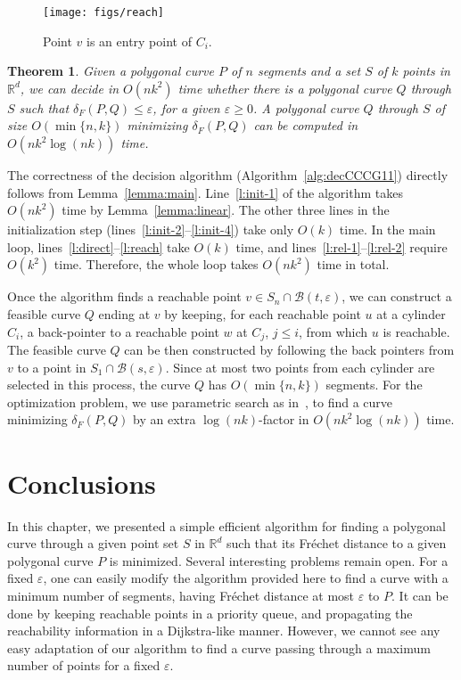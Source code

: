 \documentclass[12pt]{dalthesis}
\def\favoritefont{\bfseries \sffamily}
\def\QED{\ensuremath{{\Box}}}
\def\markatright#1{\leavevmode\unskip\nobreak\quad\hspace*{\fill}{#1}}
\newenvironment{proof}
	{\begin{trivlist}\item[\hskip\labelsep{\favoritefont Proof:}]}
	{\markatright{\QED}\end{trivlist}}
\newtheorem{theorem}{Theorem}
\newcommand{\IR}{\ensuremath{\mathbb{R}}}
\newcommand{\lee}{\leqslant}
\newcommand{\gee}{\geqslant}
\newcommand{\set}[1]{{\{ #1 \}}}
\newcommand{\eps}{\varepsilon}
\newcommand{\CB}{{\mathscr B}}
\newcommand{\Frechet}{Fr\'echet }
\newcommand{\distF}{\delta_F}
\begin{document}
\begin{figure}[t]
	\centering
	\texttt{[image: figs/reach]}
	\caption{Point $v$ is an entry point of $C_i$.}
	\label{fig:reach}
\end{figure}


\begin{theorem} \label{thm:main}
	Given a polygonal curve $P$ of $n$ segments and a set $S$ of $k$ points in $\IR^d$, 
	we can decide in $O(nk^2)$ time whether there is a polygonal curve $Q$ through $S$ 
	such that $\distF(P, Q) \lee \eps$, for a given $\eps \gee 0$.
	A polygonal curve $Q$ through $S$ of size $O(\min\set{n,k})$ minimizing $\distF(P, Q)$ 
	can be computed in $O(nk^2 \log (nk))$ time.
\end{theorem}

\begin{proof}
	The correctness of the decision algorithm (Algorithm~\ref{alg:decCCCG11})
	directly follows from Lemma~\ref{lemma:main}.
	Line~\ref{l:init-1} of the algorithm takes $O(nk^2)$ time by Lemma~\ref{lemma:linear}.
	The other three lines in the initialization step (lines~\ref{l:init-2}--\ref{l:init-4}) take only $O(k)$ time.
	In the main loop, lines~\ref{l:direct}--\ref{l:reach} take $O(k)$ time, and
	lines~\ref{l:rel-1}--\ref{l:rel-2} require $O(k^2)$ time.
	Therefore, the whole loop takes $O(nk^2)$ time in total.

	Once the algorithm finds a reachable point $v \in S_n \cap \CB(t,\eps)$,
	we can construct a feasible curve $Q$ ending at $v$ by keeping, 
	for each reachable point $u$ at a cylinder $C_i$, 
	a back-pointer to a reachable point $w$ at $C_j$, $j \lee i$, 
	from which $u$ is reachable. 
	The feasible curve $Q$ can be then constructed 
	by following the back pointers from $v$ to a point in $S_1 \cap \CB(s,\eps)$. Since at most two points from each cylinder are selected in this process,
	the curve $Q$ has $O(\min\set{n,k})$ segments.
	For the optimization problem, we use parametric search as in~\cite{AltERW03a,AltG95}, 
	to find a curve minimizing $\distF(P, Q)$ by an extra $\log(nk)$-factor
	in $O(nk^2 \log (nk))$ time.
\end{proof}




\section{Conclusions}

In this chapter, we presented a simple efficient algorithm 
for finding a polygonal curve through a given point set $S$ in $\IR^d$
such that its \Frechet distance to a given polygonal curve $P$ is minimized.
Several interesting problems remain open.
For a fixed $\eps$, one can easily modify the algorithm provided
here to find a curve with a minimum number of segments, 
having \Frechet distance at most $\eps$ to $P$.
It can be done by keeping reachable points in a priority queue,
and propagating the reachability information in a Dijkstra-like manner.
However, we cannot see any easy adaptation of our algorithm to 
find a curve passing through a maximum number of points for a fixed $\eps$.
\end{document}
